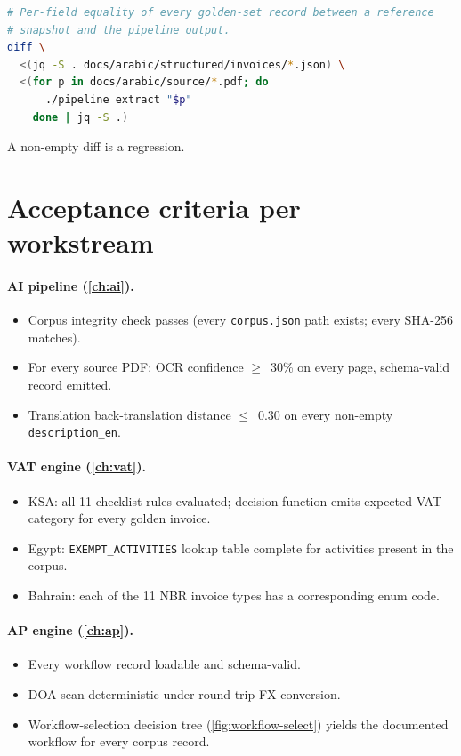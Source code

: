\begin{lstlisting}[language=bash,basicstyle=\ttfamily\small]
# Per-field equality of every golden-set record between a reference
# snapshot and the pipeline output.
diff \
  <(jq -S . docs/arabic/structured/invoices/*.json) \
  <(for p in docs/arabic/source/*.pdf; do
      ./pipeline extract "$p"
    done | jq -S .)
\end{lstlisting}

A non-empty diff is a regression.

\section{Acceptance criteria per workstream}

\paragraph{AI pipeline (\cref{ch:ai}).}
\begin{itemize}
  \item Corpus integrity check passes (every \texttt{corpus.json} path
        exists; every SHA-256 matches).
  \item For every source PDF: OCR confidence $\geq$~30\% on every page,
        schema-valid record emitted.
  \item Translation back-translation distance $\leq$~0.30 on every
        non-empty \texttt{description\_en}.
\end{itemize}

\paragraph{VAT engine (\cref{ch:vat}).}
\begin{itemize}
  \item KSA: all 11 checklist rules evaluated; decision function
        emits expected VAT category for every golden invoice.
  \item Egypt: \texttt{EXEMPT\_ACTIVITIES} lookup table complete for
        activities present in the corpus.
  \item Bahrain: each of the 11 NBR invoice types has a corresponding
        enum code.
\end{itemize}

\paragraph{AP engine (\cref{ch:ap}).}
\begin{itemize}
  \item Every workflow record loadable and schema-valid.
  \item DOA scan deterministic under round-trip FX conversion.
  \item Workflow-selection decision tree (\cref{fig:workflow-select})
        yields the documented workflow for every corpus record.
\end{itemize}

